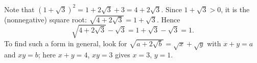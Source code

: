 Note that $(1+\sqrt3)^2=1+2\sqrt3+3=4+2\sqrt3$. Since $1+\sqrt3>0$, it is the (nonnegative) square root: $\sqrt{4+2\sqrt3}=1+\sqrt3$. Hence
\[
\sqrt{4+2\sqrt3}-\sqrt3=1+\sqrt3-\sqrt3=\boxed{1}.
\]
To find such a form in general, look for $\sqrt{a+2\sqrt b}=\sqrt x+\sqrt y$ with $x+y=a$ and $xy=b$; here $x+y=4$, $xy=3$ gives $x=3$, $y=1$.
